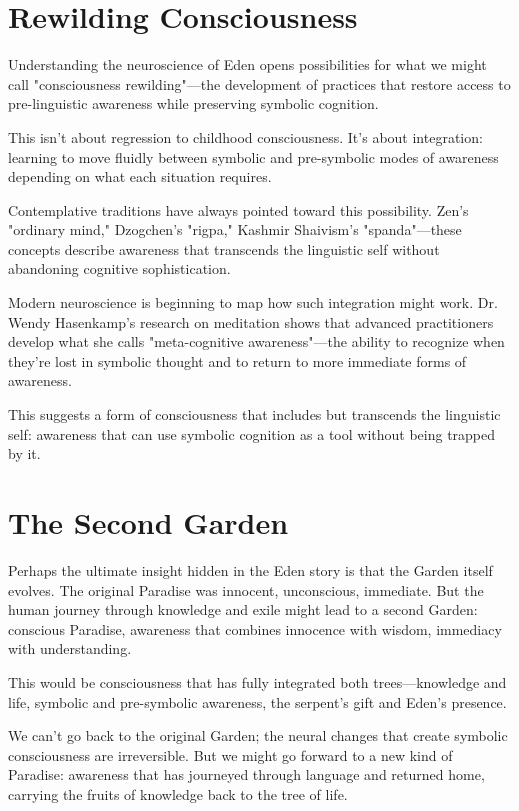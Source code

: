 \documentclass[10pt,twocolumn]{article}
\begin{document}
\section{Rewilding Consciousness}

Understanding the neuroscience of Eden opens possibilities for what we might call "consciousness rewilding"—the development of practices that restore access to pre-linguistic awareness while preserving symbolic cognition.

This isn't about regression to childhood consciousness. It's about integration: learning to move fluidly between symbolic and pre-symbolic modes of awareness depending on what each situation requires.

Contemplative traditions have always pointed toward this possibility. Zen's "ordinary mind," Dzogchen's "rigpa," Kashmir Shaivism's "spanda"—these concepts describe awareness that transcends the linguistic self without abandoning cognitive sophistication.

Modern neuroscience is beginning to map how such integration might work. Dr. Wendy Hasenkamp's research on meditation shows that advanced practitioners develop what she calls "meta-cognitive awareness"—the ability to recognize when they're lost in symbolic thought and to return to more immediate forms of awareness.

This suggests a form of consciousness that includes but transcends the linguistic self: awareness that can use symbolic cognition as a tool without being trapped by it.

\section{The Second Garden}

Perhaps the ultimate insight hidden in the Eden story is that the Garden itself evolves. The original Paradise was innocent, unconscious, immediate. But the human journey through knowledge and exile might lead to a second Garden: conscious Paradise, awareness that combines innocence with wisdom, immediacy with understanding.

This would be consciousness that has fully integrated both trees—knowledge and life, symbolic and pre-symbolic awareness, the serpent's gift and Eden's presence.

We can't go back to the original Garden; the neural changes that create symbolic consciousness are irreversible. But we might go forward to a new kind of Paradise: awareness that has journeyed through language and returned home, carrying the fruits of knowledge back to the tree of life.
\end{document}
